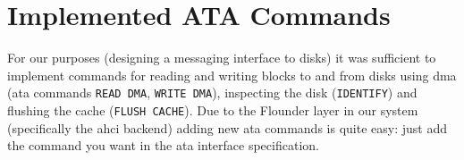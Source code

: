 \section{Implemented ATA Commands}

For our purposes (designing a messaging interface to disks) it was sufficient
to implement commands for reading and writing blocks to and from disks using
\acs{dma} (\ac{ata} commands {\tt READ DMA}, {\tt WRITE DMA}), inspecting the
disk ({\tt IDENTIFY}) and flushing the cache ({\tt FLUSH CACHE}). Due to the
Flounder layer in our system (specifically the \acs{ahci} backend) adding new
\ac{ata} commands is quite easy: just add the command you want in the \ac{ata}
interface specification.
